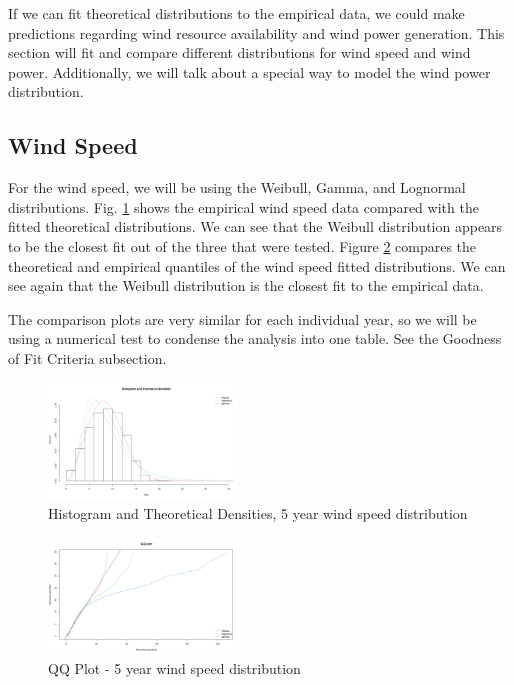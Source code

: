 \documentclass{IEEEtran}
\begin{document}
  If we can fit theoretical distributions to the empirical data, we could make predictions regarding wind resource availability and wind power generation. This section will fit and compare different distributions for wind speed and wind power. Additionally, we will talk about a special way to model the wind power distribution.

  \subsection{Wind Speed}

  For the wind speed, we will be using the Weibull, Gamma, and Lognormal distributions. Fig. \ref{fig:comp1} shows the empirical wind speed data compared with the fitted theoretical distributions. We can see that the Weibull distribution appears to be the closest fit out of the three that were tested. Figure \ref{fig:comp2} compares the theoretical and empirical quantiles of the wind speed fitted distributions. We can see again that the Weibull distribution is the closest fit to the empirical data.

  The comparison plots are very similar for each individual year, so we will be using a numerical test to condense the analysis into one table. See the Goodness of Fit Criteria subsection.

  \begin{figure}[ht!]
    \centering
    \includegraphics[width=0.45\textwidth]{figures/5yearcomparisonspeed}
    \caption{Histogram and Theoretical Densities, 5 year wind speed distribution}
    \label{fig:comp1}
  \end{figure}

  \begin{figure}
    \centering
    \includegraphics[width=0.45\textwidth]{figures/QQ5year}
    \caption{QQ Plot - 5 year wind speed distribution}
    \label{fig:comp2}
  \end{figure}
\end{document}
